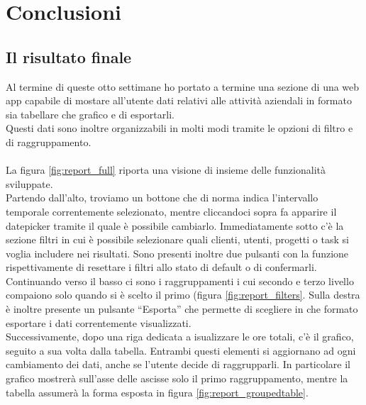 
\chapter{Conclusioni}
\label{cap:conclusioni}

\section{Il risultato finale}
Al termine di queste otto settimane ho portato a termine una sezione di una web app capabile di mostare all'utente dati relativi alle attività aziendali in formato sia tabellare che grafico e di esportarli.\\
Questi dati sono inoltre organizzabili in molti modi tramite le opzioni di filtro e di raggruppamento.\\\\
La figura \ref{fig:report_full} riporta una visione di insieme delle funzionalità sviluppate.\\
Partendo dall'alto, troviamo un bottone che di norma indica l'intervallo temporale correntemente selezionato, mentre cliccandoci sopra fa apparire il datepicker tramite il quale è possibile cambiarlo. Immediatamente sotto c'è la sezione filtri in cui è possibile selezionare quali clienti, utenti, progetti o task si voglia includere nei risultati. Sono presenti inoltre due pulsanti con la funzione rispettivamente di resettare i filtri allo stato di default o di confermarli.\\
Continuando verso il basso ci sono i raggruppamenti i cui secondo e terzo livello compaiono solo quando si è scelto il primo (figura \ref{fig:report_filters}. Sulla destra è inoltre presente un pulsante ``Esporta'' che permette di scegliere in che formato esportare i dati correntemente visualizzati.\\
Successivamente, dopo una riga dedicata a isualizzare le ore totali, c'è il grafico, seguito a sua volta dalla tabella. Entrambi questi elementi si aggiornano ad ogni cambiamento dei dati, anche se l'utente decide di raggrupparli. In particolare il grafico mostrerà sull'asse delle ascisse solo il primo raggruppamento, mentre la tabella assumerà la forma esposta in figura \ref{fig:report_groupedtable}.\\
